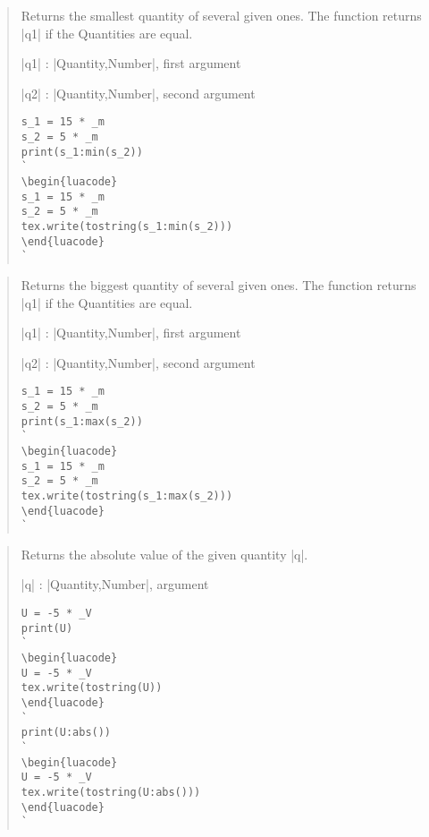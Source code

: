\documentclass{ltxdoc}
\begin{document}
\begin{quote}
  Returns the smallest quantity of several given ones. The function returns |q1| if the Quantities are equal.

  \begin{description}
  \item |q1| : |Quantity,Number|, first argument

  \item |q2| : |Quantity,Number|, second argument
  \end{description}


\begin{lstlisting}
s_1 = 15 * _m
s_2 = 5 * _m
print(s_1:min(s_2))
`
\begin{luacode}
s_1 = 15 * _m
s_2 = 5 * _m
tex.write(tostring(s_1:min(s_2)))
\end{luacode}
`
\end{lstlisting}
\end{quote}


\begin{quote}
  Returns the biggest quantity of several given ones. The function returns |q1| if the Quantities are equal.

  \begin{description}
  \item |q1| : |Quantity,Number|, first argument

  \item |q2| : |Quantity,Number|, second argument
  \end{description}


\begin{lstlisting}
s_1 = 15 * _m
s_2 = 5 * _m
print(s_1:max(s_2))
`
\begin{luacode}
s_1 = 15 * _m
s_2 = 5 * _m
tex.write(tostring(s_1:max(s_2)))
\end{luacode}
`
\end{lstlisting}
\end{quote}




\begin{quote}
  Returns the absolute value of the given quantity |q|.

  \begin{description}
  \item |q| : |Quantity,Number|, argument
  \end{description}


\begin{lstlisting}
U = -5 * _V
print(U)
`
\begin{luacode}
U = -5 * _V
tex.write(tostring(U))
\end{luacode}
`
print(U:abs())
`
\begin{luacode}
U = -5 * _V
tex.write(tostring(U:abs()))
\end{luacode}
`
\end{lstlisting}
\end{quote}
\end{document}
